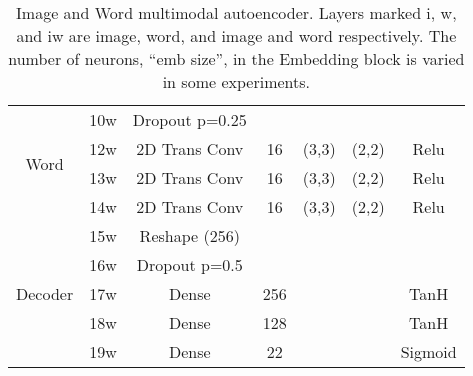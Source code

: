 \begin{table}
\begin{tabular}{|c|c|c|c|c|c|c|}
			\multirow{4}{*}{Word} & 10w 	&	Dropout p=0.25 &	 & 	     &       & \\ \cline{2-7}
			& 12w	&	2D Trans Conv & 16 & (3,3) & (2,2)  & Relu \\ \cline{2-7}
			& 13w	&	2D Trans Conv & 16 & (3,3) & (2,2)  & Relu \\ \cline{2-7}
			& 14w	&	2D Trans Conv & 16 & (3,3) & (2,2)  & Relu \\ \cline{2-7}
\multirow{5}{*}{Decoder}& 15w	& Reshape (256) & & & & \\ \cline{2-7}
			& 16w	& Dropout p=0.5 &	 & 	     &       & \\ \cline{2-7}
			& 17w	& Dense & 256 & & &TanH \\ \cline{2-7}
			& 18w	& Dense & 128 & & &TanH \\ \cline{2-7}
			& 19w	& Dense & 22 & & & Sigmoid \\ \hline
			
			
		\end{tabular}
		\caption{Image and Word multimodal autoencoder. Layers marked i, w, and iw are image, word, and image and word respectively. The number of neurons, ``emb size'', in the Embedding block is varied in some experiments.}
		\label{tab:Arts_MAE_description}

	\end{table}



